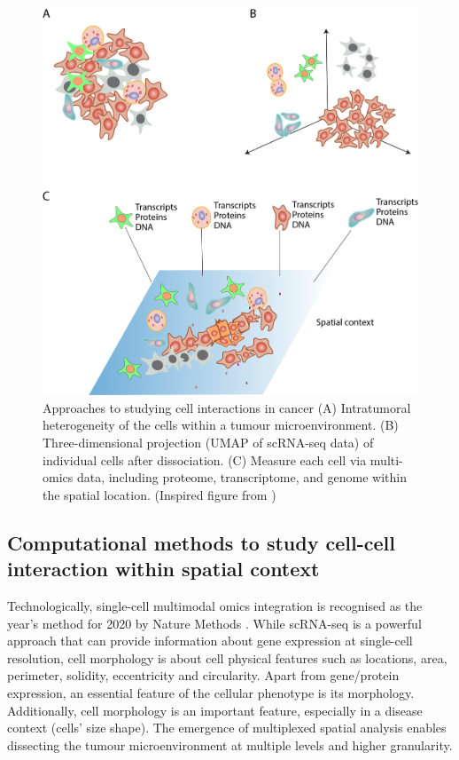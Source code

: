 \begin{figure}[hbt]
    \centering
    \includegraphics[width=0.7\columnwidth]{Chapter1/Figures/Chap1_Figure5.png}
    \caption{Approaches to studying cell interactions in cancer (A) Intratumoral heterogeneity of the cells within a tumour microenvironment. (B) Three-dimensional projection (\ie UMAP of scRNA-seq data) of individual cells after dissociation. (C) Measure each cell via multi-omics data, including proteome, transcriptome, and genome within the spatial location. (Inspired figure from \cite{de2020unraveling})}
    \label{fig:multimodal_approach_cci}
\end{figure}

\subsection{Computational methods to study cell-cell interaction within spatial context}
\label{Chap1:Sub_Computational} 

 Technologically, single-cell multimodal omics integration is recognised as the year's method for 2020 by Nature Methods \cite{teichmann2020method}. While scRNA-seq is a powerful approach that can provide information about gene expression at single-cell resolution, cell morphology is about cell physical features such as locations, area, perimeter, solidity, eccentricity and circularity. Apart from gene/protein expression, an essential feature of the cellular phenotype is its morphology. Additionally, cell morphology is an important feature, especially in a disease context (\ie cells' size shape). The emergence of multiplexed spatial analysis enables dissecting the tumour microenvironment at multiple levels and higher granularity. 

